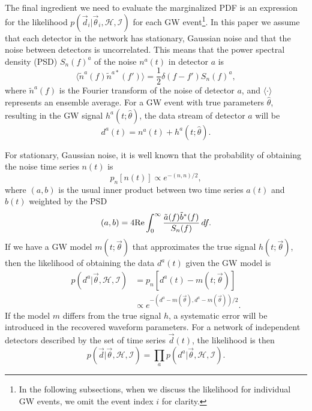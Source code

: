\documentclass[twocolumn,prd,amssymb,aps,nofootinbib,showpacs,epsf]{revtex4}
\begin{document}
The final ingredient we need to evaluate the marginalized PDF is an expression for the likelihood $p(\vec d_i | \vec\theta_i,\mathcal{H},\mathcal{I})$ for each GW event\footnote{In the following subsections, when we discuss the likelihood for individual GW events, we omit the event index $i$ for clarity.}. In this paper we assume that each detector in the network has stationary, Gaussian noise and that the noise between detectors is uncorrelated. This means that the power spectral density (PSD) $S_n(f)^a$ of the noise $n^a(t)$ in detector $a$ is
\begin{equation}
\langle \tilde n^a(f) \tilde n^{a*}(f') \rangle = \frac{1}{2} \delta (f-f') S_n(f)^a,
\end{equation}
where $\tilde n^a(f)$ is the Fourier transform of the noise of detector $a$, and $\langle\cdot\rangle$ represents an ensemble average. For a GW event with true parameters $\hat\theta$, resulting in the GW signal $h^a(t; \hat\theta)$, the data stream of detector $a$ will be
\begin{equation}
d^a(t) = n^a(t) + h^a(t; \hat\theta).
\end{equation}

For stationary, Gaussian noise, it is well known that the probability of obtaining the noise time series $n(t)$ is
\begin{equation}
p_n[n(t)] \propto e^{-(n, n)/2},
\end{equation}
where $(a, b)$ is the usual inner product between two time series $a(t)$ and $b(t)$ weighted by the PSD
\begin{equation}
(a, b)=4{\rm Re} \int_0^\infty \frac{\tilde a(f) \tilde b^*(f)}{S_n(f)}\,df.
\end{equation}
If we have a GW model $m(t;\vec\theta)$ that approximates the true signal $h(t;\vec\theta)$, then the likelihood of obtaining the data $d^a(t)$ given the GW model is
\begin{align}
p(d^a | \vec\theta, \mathcal{H}, \mathcal{I}) &= p_n[d^a(t)-m(t; \vec\theta)] \nonumber\\
& \propto e^{-(d^a - m(\vec\theta), d^a - m(\vec\theta))/2}.
\end{align}
If the model $m$ differs from the true signal $h$, a systematic error will be introduced in the recovered waveform parameters. For a network of independent detectors described by the set of time series $\vec d(t)$, the likelihood is then
\begin{equation}
p(\vec d | \vec\theta, \mathcal{H}, \mathcal{I}) = \prod_a p(d^a | \vec\theta, \mathcal{H}, \mathcal{I}).
\end{equation}
\end{document}
